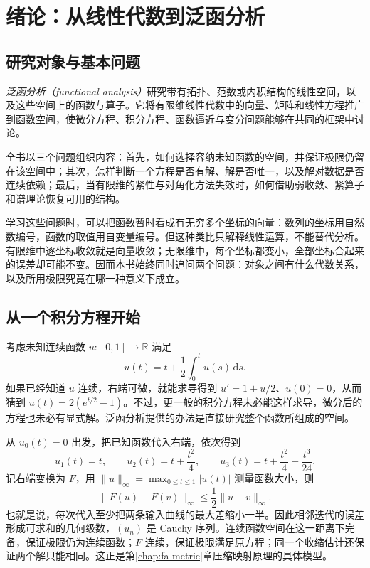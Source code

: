 \setcounter{chapter}{0} %
\chapter{绪论：从线性代数到泛函分析}
\label{chap:fa-introduction}

\section{研究对象与基本问题}

\emph{泛函分析（functional analysis）}研究带有拓扑、范数或内积结构的线性空间，以及这些空间上的函数与算子。它将有限维线性代数中的向量、矩阵和线性方程推广到函数空间，使微分方程、积分方程、函数逼近与变分问题能够在共同的框架中讨论。

全书以三个问题组织内容：首先，如何选择容纳未知函数的空间，并保证极限仍留在该空间中；其次，怎样判断一个方程是否有解、解是否唯一，以及解对数据是否连续依赖；最后，当有限维的紧性与对角化方法失效时，如何借助弱收敛、紧算子和谱理论恢复可用的结构。

学习这些问题时，可以把函数暂时看成有无穷多个坐标的向量：数列的坐标用自然数编号，函数的取值用自变量编号。但这种类比只解释线性运算，不能替代分析。有限维中逐坐标收敛就是向量收敛；无限维中，每个坐标都变小，全部坐标合起来的误差却可能不变。因而本书始终同时追问两个问题：对象之间有什么代数关系，以及所用极限究竟在哪一种意义下成立。

\section{从一个积分方程开始}
考虑未知连续函数 $u:[0,1]\to\mathbb R$ 满足
\begin{equation}
 u(t)=t+\frac12\int_0^t u(s)\,\mathrm ds.
 \label{eq:fa-intro-integral}
\end{equation}
如果已经知道 $u$ 连续，右端可微，就能求导得到 $u'=1+u/2$、$u(0)=0$，从而猜到 $u(t)=2(e^{t/2}-1)$。不过，更一般的积分方程未必能这样求导，微分后的方程也未必有显式解。泛函分析提供的办法是直接研究整个函数所组成的空间。

从 $u_0(t)=0$ 出发，把已知函数代入右端，依次得到
\[
 u_1(t)=t,\qquad u_2(t)=t+\frac{t^2}{4},\qquad
 u_3(t)=t+\frac{t^2}{4}+\frac{t^3}{24}.
\]
记右端变换为 $F$，用 $\|u\|_\infty=\max_{0\leq t\leq1}|u(t)|$ 测量函数大小，则
\[
 \|F(u)-F(v)\|_\infty
 \leq\frac12\|u-v\|_\infty.
\]
也就是说，每次代入至少把两条输入曲线的最大差缩小一半。因此相邻迭代的误差形成可求和的几何级数，$(u_n)$ 是 Cauchy 序列。连续函数空间在这一距离下完备，保证极限仍为连续函数；$F$ 连续，保证极限满足原方程；同一个收缩估计还保证两个解只能相同。这正是第\ref{chap:fa-metric}章压缩映射原理的具体模型。

